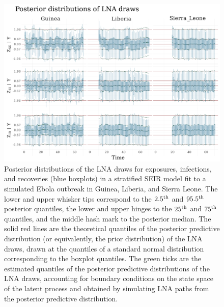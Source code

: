 \begin{figure}[htbp]
	\begin{fullpage}
		\centering
		\includegraphics[width=\linewidth]{figures/ebola_synth_drawplots}
		\caption[Posterior distributions of LNA draws for a stratified SEIR model fit to a simulated Ebola outbreak.]{Posterior distributions of the LNA draws for exposures, infections, and recoveries (blue boxplots) in a stratified SEIR model fit to a simulated Ebola outbreak in Guinea, Liberia, and Sierra Leone. The lower and upper whisker tips correspond to the $ 2.5^{\mathrm{th}} $ and $ 95.5^{\mathrm{th}} $ posterior quantiles, the lower and upper hinges to the $ 25^{\mathrm{th}} $ and $ 75^{\mathrm{th}} $ quantiles, and the middle hash mark to the posterior median. The solid red lines are the theoretical quantiles of the posterior predictive distribution (or equivalently, the prior distribution) of the LNA draws, drawn at the quantiles of a standard normal distribution corresponding to the boxplot quantiles. The green ticks are the estimated quantiles of the posterior predictive distributions of the LNA draws, accounting for boundary conditions on the state space of the latent process and obtained by simulating LNA paths from the posterior predictive distribution.}
		\label{fig:ebola_synth_drawplots}
	\end{fullpage}
\end{figure}

\newpage
